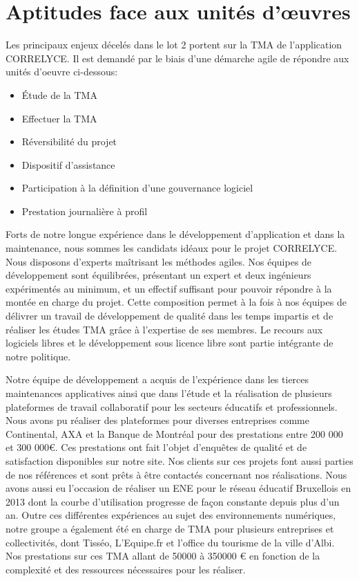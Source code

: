 \section{Aptitudes face aux unités d'œuvres}
	Les principaux enjeux décelés dans le lot 2 portent sur la TMA de l’application CORRELYCE. Il est demandé par le biais d’une démarche agile de répondre aux unités d’oeuvre ci-dessous: 
	\begin{itemize}
		\item Étude de la TMA
		\item Effectuer la TMA
		\item Réversibilité du projet
		\item Dispositif d’assistance
		\item Participation à la définition d’une gouvernance logiciel
		\item Prestation journalière à profil 
	\end{itemize}

	Forts de notre longue expérience dans le développement d’application et dans la maintenance, nous sommes les candidats idéaux pour le projet CORRELYCE. Nous disposons d’experts maîtrisant les méthodes agiles. Nos équipes de développement sont équilibrées, présentant un expert et deux ingénieurs expérimentés au minimum, et un effectif suffisant pour pouvoir répondre à la montée en charge du projet. Cette composition permet à la fois à nos équipes de délivrer un travail de développement de qualité dans les temps impartis et de réaliser les études TMA grâce à l’expertise de ses membres.  Le recours aux logiciels libres et le développement sous licence libre sont partie intégrante de notre politique.
	
	Notre équipe de développement a acquis de l’expérience dans les tierces maintenances applicatives ainsi que dans l’étude et la réalisation de plusieurs plateformes de travail collaboratif pour les secteurs éducatifs et professionnels. Nous avons pu réaliser des plateformes pour diverses entreprises comme Continental, AXA et la Banque de Montréal pour des prestations entre 200 000 et 300 000\euro{}. Ces prestations ont fait l’objet d’enquêtes de qualité et de satisfaction disponibles sur notre site. Nos clients sur ces projets font aussi parties de nos références et sont prêts à être contactés concernant nos réalisations. Nous avons aussi eu l’occasion de réaliser un ENE pour le réseau éducatif Bruxellois en 2013 dont la courbe d’utilisation progresse de façon constante depuis plus d’un an. Outre ces différentes expériences au sujet des environnements numériques, notre groupe a également été en charge de TMA pour plusieurs entreprises et collectivités, dont Tisséo, L’Equipe.fr et l’office du tourisme de la ville d’Albi. Nos prestations sur ces TMA allant de 50000 à 350000 € en fonction de la complexité et des ressources nécessaires pour les réaliser.
	
